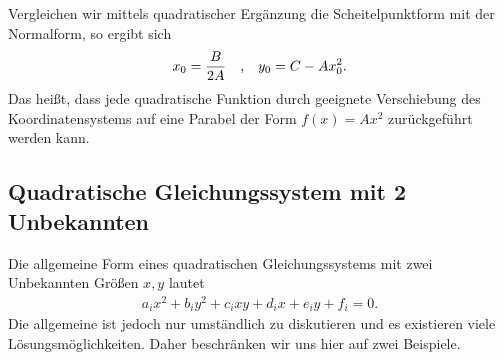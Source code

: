 \begin{wrapfigure}{r}{6cm}
    \centering
    \vspace{-5mm}
    \vspace{-5mm}
\end{wrapfigure}

Vergleichen wir mittels quadratischer Ergänzung die Scheitelpunktform mit der Normalform, so ergibt sich 
\begin{align}
    x_0 = \frac{B}{2A} \qq{,} y_0 = C -A x_0^2.
\end{align}
Das heißt, dass jede quadratische Funktion durch geeignete Verschiebung des Koordinatensystems auf eine Parabel der Form $f(x) = A x^2$ zurückgeführt werden kann.

\clearpage
\subsection{Quadratische Gleichungssystem mit 2 Unbekannten}

Die allgemeine Form eines quadratischen Gleichungssystems mit zwei Unbekannten Größen $x,y$ lautet 
\begin{align}
    a_i x^2 + b_i y^2 + c_i xy + d_i x + e_i y + f_i = 0.
\end{align}
Die allgemeine ist jedoch nur umständlich zu diskutieren und es existieren viele Lösungsmöglichkeiten. Daher beschränken wir uns hier auf zwei Beispiele. 

